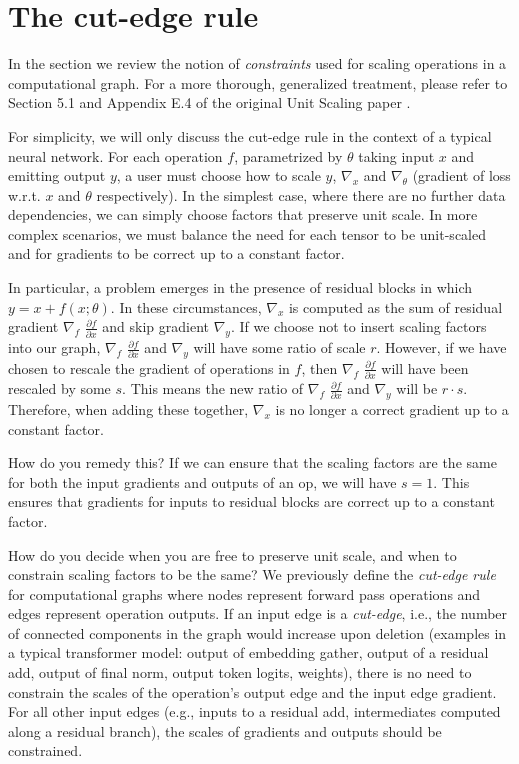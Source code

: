 \section{The cut-edge rule} \label{app:cut_edge_rule}

In the section we review the notion of \textit{constraints} used for scaling operations in a computational graph. For a more thorough, generalized treatment, please refer to Section 5.1 and Appendix E.4 of the original Unit Scaling paper \cite{Unit_Scaling}.

For simplicity, we will only discuss the cut-edge rule in the context of a typical neural network. For each operation $f$, parametrized by $\theta$ taking input $x$ and emitting output $y$, a user must choose how to scale $y$, $\nabla_x$ and $\nabla_\theta$ (gradient of loss w.r.t. $x$ and $\theta$ respectively). In the simplest case, where there are no further data dependencies, we can simply choose factors that preserve unit scale. In more complex scenarios, we must balance the need for each tensor to be unit-scaled and for gradients to be correct up to a constant factor.

In particular, a problem emerges in the presence of residual blocks in which $y = x + f(x; \theta)$. In these circumstances, $\nabla_x$ is computed as the sum of residual gradient $\nabla_f$ $\frac{\partial{f}}{\partial{x}}$ and  skip gradient $\nabla_y$. If we choose not to insert scaling factors into our graph, $\nabla_f$ $\frac{\partial{f}}{\partial{x}}$ and $\nabla_y$ will have some ratio of scale $r$. However, if we have chosen to rescale the gradient of operations in $f$, then $\nabla_f$ $\frac{\partial{f}}{\partial{x}}$ will have been rescaled by some $s$. This means the new ratio of $\nabla_f$ $\frac{\partial{f}}{\partial{x}}$ and $\nabla_y$ will be $r \cdot s$. Therefore,  when adding these together, $\nabla_x$ is no longer a correct gradient up to a constant factor.

How do you remedy this? If we can ensure that the scaling factors are the same for both the input gradients and outputs of an op, we will have $s=1$. This ensures that gradients for inputs to residual blocks are correct up to a constant factor.

How do you decide when you are free to preserve unit scale, and when to constrain scaling factors to be the same? We previously define the \textit{cut-edge rule} \cite{Unit_Scaling} for computational graphs where nodes represent forward pass operations and edges represent operation outputs. If an input edge is a \textit{cut-edge}, i.e., the number of connected components in the graph would increase upon deletion (examples in a typical transformer model: output of embedding gather, output of a residual add, output of final norm, output token logits, weights), there is no need to constrain the scales of the operation's output edge and the input edge gradient. For all other input edges (e.g., inputs to a residual add, intermediates computed along a residual branch), the scales of gradients and outputs should be constrained.